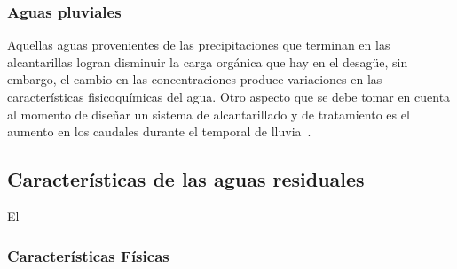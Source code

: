 \subsubsection*{Aguas pluviales}
Aquellas aguas provenientes de las precipitaciones que terminan en las alcantarillas logran disminuir la carga orgánica que hay en el desagüe, sin embargo, el cambio en las concentraciones produce variaciones en las características fisicoquímicas del agua. Otro aspecto que se debe tomar en cuenta al momento de diseñar un sistema de alcantarillado y de tratamiento es el aumento en los caudales durante el temporal de lluvia~\citep{lazcano2016}.
\subsection{Características de las aguas residuales}
El 
\subsubsection{Características Físicas}
